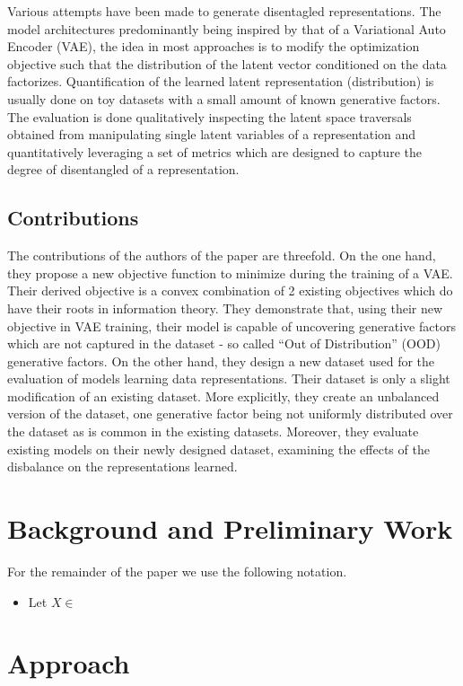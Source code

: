 \documentclass[twoside,11pt]{article}
\begin{document}
Various attempts have been made to generate disentagled representations. The model architectures predominantly being inspired by that of a Variational Auto Encoder (VAE), the idea in most approaches is to modify the optimization objective such that the distribution of the latent vector conditioned on the data factorizes.
Quantification of the learned latent representation (distribution) is usually done on toy datasets with a small amount of known generative factors. The evaluation is done qualitatively inspecting the latent space traversals obtained from manipulating single latent variables of a representation and quantitatively leveraging a set of metrics which are designed to capture the degree of disentangled of a representation.

\subsection{Contributions}
The contributions of the authors of the paper are threefold. On the one hand, they propose a new objective function to minimize during the training of a VAE. Their derived objective is a convex combination of 2 existing objectives which do have their roots in information theory.
They demonstrate that, using their new objective in VAE training, their model is capable of uncovering generative factors which are not captured in the dataset - so called \enquote{Out of Distribution} (OOD) generative factors.
On the other hand, they design a new dataset used for the evaluation of models learning data representations. Their dataset is only a slight modification of an existing dataset. More explicitly, they create an unbalanced version of the dataset, one generative factor being not uniformly distributed over the dataset as is common in the existing datasets.
Moreover, they evaluate existing models on their newly designed dataset, examining the effects of the disbalance on the representations learned.

\section{Background and Preliminary Work}
For the remainder of the paper we use the following notation.
\begin{itemize}
    \item Let $X \in $
\end{itemize}


\section{Approach}
\end{document}
